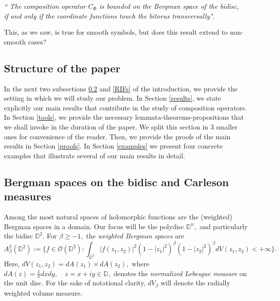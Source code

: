 \documentclass[12pt]{amsart}
\numberwithin{equation}{section}
\begin{document}
\begin{center}\textit{ `` The composition operator $C_{\Phi}$ is bounded on the Bergman space of the bidisc,\\ if and only if the coordinate functions touch the bitorus transversally".}
\end{center}
This, as we saw, is true for smooth symbols, but does this result extend to non-smooth cases?

\subsection{Structure of the paper} 
 In the next two subsections \ref{Bergman} and \ref{RIFs} of the introduction, we provide the setting in which we will study our problem. In Section \ref{results}, we state explicitly our main results that contribute in the study of composition operators. In Section \ref{tools}, we provide the necessary lemmata-theorems-propositions that we shall invoke in the duration of the paper. We split this section in 3 smaller ones for convenience of the reader. Then, we provide the proofs of the main results in Section \ref{proofs}. In Section \ref{examples} we present four concrete examples that illustrate several of our main results in detail.  

\subsection{Bergman spaces on the bidisc and Carleson measures}\label{Bergman}
Among the most natural spaces of holomorphic functions are the (weighted) Bergman spaces in a domain. Our focus will be the polydisc $\mathbb{D}^n,$ and particularly the bidisc $\mathbb{D}^2$. For $\beta\ge-1,$ the \textit{weighted Bergman spaces} are 
$$A^2_{\beta}(\mathbb{D}^2):=\Bigg\{f\in \mathcal{O}(\mathbb{D}^2):\int_{\mathbb{D}^2}|f(z_1,z_2)|^2(1-|z_1|^2)^{\beta}(1-|z_2|^2)^{\beta}dV(z_1,z_2)<+\infty\Bigg\}.$$ Here, $dV(z_1,z_2)=dA(z_1)\times dA(z_2),$ where $dA(z)=\frac{1}{\pi}dxdy,\quad z=x+iy\in\mathbb{D},$ denotes the \textit{normalized Lebesgue measure} on the unit disc. For the sake of notational clarity, $dV_{\beta}$ will denote the radially weighted volume measure.
\end{document}
